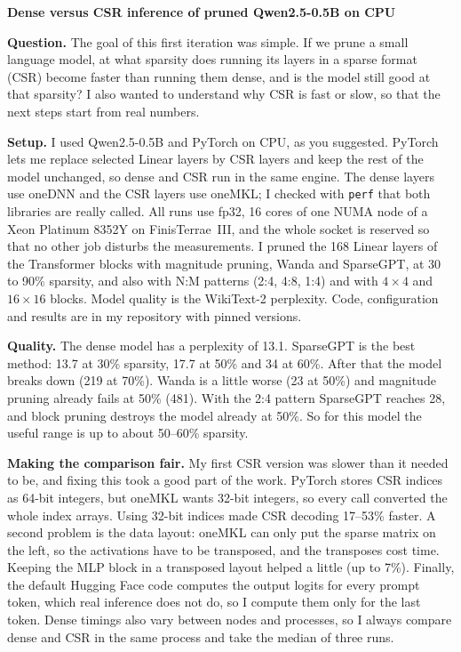 \documentclass[11pt,a4paper]{article}
\begin{document}
{\large\textbf{Dense versus CSR inference of pruned Qwen2.5-0.5B on CPU}}\\[0.2em]

\medskip

\textbf{Question.} The goal of this first iteration was simple. If we prune
a small language model, at what sparsity does running its layers in a
sparse format (CSR) become faster than running them dense, and is the model
still good at that sparsity? I also wanted to understand why CSR is fast or
slow, so that the next steps start from real numbers.

\textbf{Setup.} I used Qwen2.5-0.5B and PyTorch on CPU, as you suggested.
PyTorch lets me replace selected Linear layers by CSR layers and keep the
rest of the model unchanged, so dense and CSR run in the same engine. The
dense layers use oneDNN and the CSR layers use oneMKL; I checked with
\texttt{perf} that both libraries are really called. All runs use fp32, 16
cores of one NUMA node of a Xeon Platinum 8352Y on FinisTerrae~III, and the
whole socket is reserved so that no other job disturbs the measurements.
I pruned the 168 Linear layers of the Transformer blocks with magnitude
pruning, Wanda and SparseGPT, at 30 to 90\% sparsity, and also with N:M
patterns (2:4, 4:8, 1:4) and with $4\times4$ and $16\times16$ blocks. Model
quality is the WikiText-2 perplexity. Code, configuration and results are in
my repository with pinned versions.

\textbf{Quality.} The dense model has a perplexity of 13.1. SparseGPT is
the best method: 13.7 at 30\% sparsity, 17.7 at 50\% and 34 at 60\%. After
that the model breaks down (219 at 70\%). Wanda is a little worse (23 at
50\%) and magnitude pruning already fails at 50\% (481). With the 2:4
pattern SparseGPT reaches 28, and block pruning destroys the model already
at 50\%. So for this model the useful range is up to about 50--60\%
sparsity.

\textbf{Making the comparison fair.} My first CSR version was slower than
it needed to be, and fixing this took a good part of the work. PyTorch
stores CSR indices as 64-bit integers, but oneMKL wants 32-bit integers, so
every call converted the whole index arrays. Using 32-bit indices made CSR
decoding 17--53\% faster. A second problem is the data layout: oneMKL can
only put the sparse matrix on the left, so the activations have to be
transposed, and the transposes cost time. Keeping the MLP block in a
transposed layout helped a little (up to 7\%). Finally, the default
Hugging Face code computes the output logits for every prompt token, which
real inference does not do, so I compute them only for the last token.
Dense timings also vary between nodes and processes, so I always compare
dense and CSR in the same process and take the median of three runs.
\end{document}
